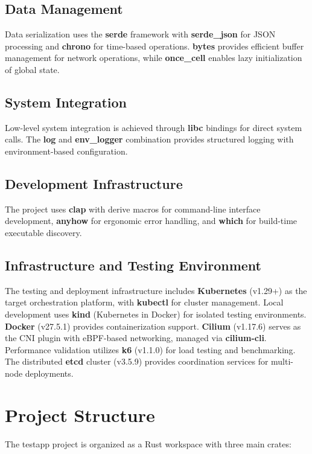\documentclass{article}
\begin{document}
\subsection*{Data Management}
Data serialization uses the \textbf{serde} framework with \textbf{serde\_json} for JSON processing and \textbf{chrono} for time-based operations. \textbf{bytes} provides efficient buffer management for network operations, while \textbf{once\_cell} enables lazy initialization of global state.

\subsection*{System Integration}
Low-level system integration is achieved through \textbf{libc} bindings for direct system calls. The \textbf{log} and \textbf{env\_logger} combination provides structured logging with environment-based configuration.

\subsection*{Development Infrastructure}
The project uses \textbf{clap} with derive macros for command-line interface development, \textbf{anyhow} for ergonomic error handling, and \textbf{which} for build-time executable discovery.

\subsection*{Infrastructure and Testing Environment}
The testing and deployment infrastructure includes \textbf{Kubernetes} (v1.29+) as the target orchestration platform, with \textbf{kubectl} for cluster management. Local development uses \textbf{kind} (Kubernetes in Docker) for isolated testing environments. \textbf{Docker} (v27.5.1) provides containerization support. \textbf{Cilium} (v1.17.6) serves as the CNI plugin with eBPF-based networking, managed via \textbf{cilium-cli}. Performance validation utilizes \textbf{k6} (v1.1.0) for load testing and benchmarking. The distributed \textbf{etcd} cluster (v3.5.9) provides coordination services for multi-node deployments.

\section*{Project Structure}

The testapp project is organized as a Rust workspace with three main crates:
\end{document}
